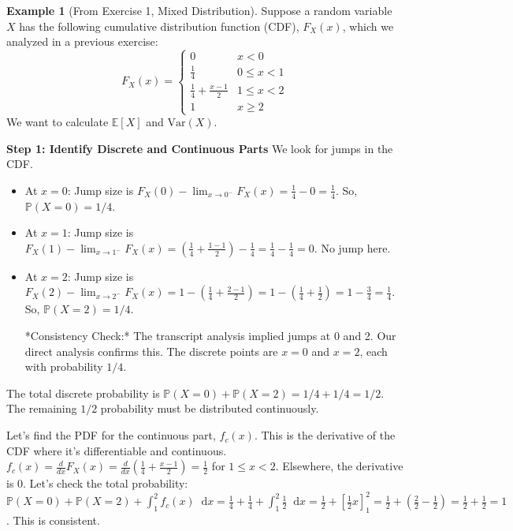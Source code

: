 \documentclass[11pt, letterpaper]{article}
\theoremstyle{plain} %
\theoremstyle{definition} %
\newtheorem{example}[theorem]{Example}
\theoremstyle{remark} %
\newcommand{\E}{\mathbb{E}}
\newcommand{\Var}{\mathrm{Var}}
\newcommand{\Prob}{\mathbb{P}}
\newcommand{\dee}{\mathop{}\!\mathrm{d}} %
\begin{document}
\begin{example}[From Exercise 1, Mixed Distribution] \label{ex:mixed}
Suppose a random variable $X$ has the following cumulative distribution function (CDF), $F_X(x)$, which we analyzed in a previous exercise:
\[ F_X(x) = \begin{cases} 0 & x < 0 \\ \frac{1}{4} & 0 \le x < 1 \\ \frac{1}{4} + \frac{x-1}{2} & 1 \le x < 2 \\ 1 & x \ge 2 \end{cases} \]
We want to calculate $\E[X]$ and $\Var(X)$.

\textbf{Step 1: Identify Discrete and Continuous Parts}
We look for jumps in the CDF.
\begin{itemize}
    \item At $x=0$: Jump size is $F_X(0) - \lim_{x \to 0^-} F_X(x) = \frac{1}{4} - 0 = \frac{1}{4}$. So, $\Prob(X=0) = 1/4$.
    \item At $x=1$: Jump size is $F_X(1) - \lim_{x \to 1^-} F_X(x) = (\frac{1}{4} + \frac{1-1}{2}) - \frac{1}{4} = \frac{1}{4} - \frac{1}{4} = 0$. No jump here.
    \item At $x=2$: Jump size is $F_X(2) - \lim_{x \to 2^-} F_X(x) = 1 - (\frac{1}{4} + \frac{2-1}{2}) = 1 - (\frac{1}{4} + \frac{1}{2}) = 1 - \frac{3}{4} = \frac{1}{4}$. So, $\Prob(X=2) = 1/4$.

    *Consistency Check:* The transcript analysis implied jumps at 0 and 2. Our direct analysis confirms this. The discrete points are $x=0$ and $x=2$, each with probability $1/4$.
\end{itemize} %

The total discrete probability is $\Prob(X=0) + \Prob(X=2) = 1/4 + 1/4 = 1/2$.
The remaining $1/2$ probability must be distributed continuously.

Let's find the PDF for the continuous part, $f_c(x)$. This is the derivative of the CDF where it's differentiable and continuous.
$f_c(x) = \frac{d}{dx} F_X(x) = \frac{d}{dx} (\frac{1}{4} + \frac{x-1}{2}) = \frac{1}{2}$ for $1 \le x < 2$.
Elsewhere, the derivative is 0.
Let's check the total probability: $\Prob(X=0) + \Prob(X=2) + \int_1^2 f_c(x) \dee x = \frac{1}{4} + \frac{1}{4} + \int_1^2 \frac{1}{2} \dee x = \frac{1}{2} + [\frac{1}{2}x]_1^2 = \frac{1}{2} + (\frac{2}{2} - \frac{1}{2}) = \frac{1}{2} + \frac{1}{2} = 1$. This is consistent.


\end{example}
\end{document}
